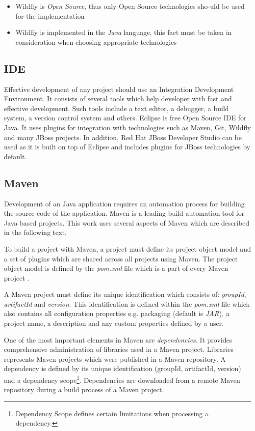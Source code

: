 \documentclass[12pt,oneside]{fithesis2}
\begin{document}
\begin{itemize}
	\item Wildfly is \textit{Open Source}, thus only Open Source technologies sho-uld be used for the implementation
	\item Wildfly is implemented in the \textit{Java} language, this fact must be taken in consideration when choosing appropriate technologies
\end{itemize}

\subsection{IDE}
Effective development of any project should use an Integration Development Environment. It consists of several tools which help developer with fast and effective development. Such tools include a text editor, a debugger, a build system, a version control system and others. Eclipse is free Open Source IDE for Java. It uses plugins for integration with technologies such as Maven, Git, Wildfly and many JBoss projects. In addition, Red Hat JBoss Developer Studio can be used as it is built on top of Eclipse and includes plugins for JBoss technologies by default.

\subsection{Maven}
Development of an Java application requires an automation process for building the source code of the application. Maven is a leading build automation tool for Java based projects. This work uses several aspects of Maven which are described in the following text.

To build a project with Maven, a project must define its project object model and a set of plugins which are shared across all projects using Maven. The project object model is defined by the \textit{pom.xml} file which is a part of every Maven project \cite{maven_doc}. 

A Maven project must define its unique identification which consists of: \textit{groupId}, \textit{artifactId} and \textit{version}. This identification is defined within the \textit{pom.xml} file which also contains all configuration properties e.g. packaging (default is \textit{JAR}), a project name, a description and any custom properties defined by a user.

One of the most important elements in Maven are \textit{dependencies}. It provides comprehensive administration of libraries used in a Maven project. Libraries represents Maven projects which were published in a Maven repository. A dependency is defined by its unique identification (groupId, artifactId, version) and a dependency scope\footnote{Dependency Scope defines certain limitations when processing a dependency.}. Dependencies are downloaded from a remote Maven repository during a build process of a Maven project.
\end{document}
